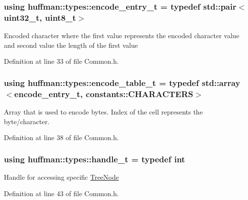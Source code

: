 \subsubsection[{\texorpdfstring{encode\+\_\+entry\+\_\+t}{encode_entry_t}}]{\setlength{\rightskip}{0pt plus 5cm}using {\bf huffman\+::types\+::encode\+\_\+entry\+\_\+t} = typedef std\+::pair$<$uint32\+\_\+t, uint8\+\_\+t$>$}\hypertarget{namespacehuffman_1_1types_a562530b9038f6a3cb2923f1c116a450c}{}\label{namespacehuffman_1_1types_a562530b9038f6a3cb2923f1c116a450c}
Encoded character where the first value represents the encoded character value and second value the length of the first value 

Definition at line 33 of file Common.\+h.

\subsubsection[{\texorpdfstring{encode\+\_\+table\+\_\+t}{encode_table_t}}]{\setlength{\rightskip}{0pt plus 5cm}using {\bf huffman\+::types\+::encode\+\_\+table\+\_\+t} = typedef std\+::array$<${\bf encode\+\_\+entry\+\_\+t}, {\bf constants\+::\+C\+H\+A\+R\+A\+C\+T\+E\+RS}$>$}\hypertarget{namespacehuffman_1_1types_a2d111e21190970dfeb935ef0786973c0}{}\label{namespacehuffman_1_1types_a2d111e21190970dfeb935ef0786973c0}
Array that is used to encode bytes. Index of the cell represents the byte/character. 

Definition at line 38 of file Common.\+h.

\subsubsection[{\texorpdfstring{handle\+\_\+t}{handle_t}}]{\setlength{\rightskip}{0pt plus 5cm}using {\bf huffman\+::types\+::handle\+\_\+t} = typedef int}\hypertarget{namespacehuffman_1_1types_a41dc8ca07e19043152b0a5c8b5fec90b}{}\label{namespacehuffman_1_1types_a41dc8ca07e19043152b0a5c8b5fec90b}
Handle for accessing specific \hyperlink{classhuffman_1_1TreeNode}{Tree\+Node} 

Definition at line 43 of file Common.\+h.

